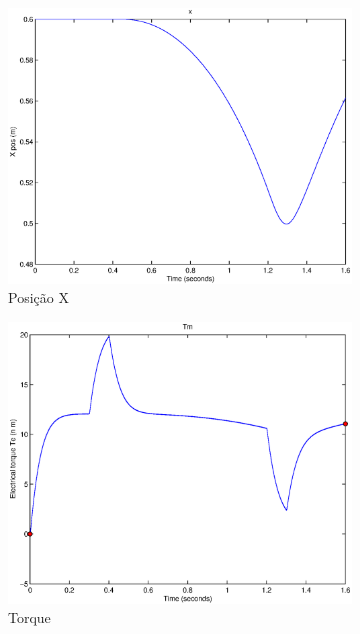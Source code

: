 \documentclass{article}
\begin{document}
\begin{figure}[H]
\begin{subfigure}{0.45\textwidth}
		\includegraphics[width=\linewidth]{matlab/x7}
		\caption{Posição X}
	\end{subfigure}
	\begin{subfigure}{0.45\textwidth}
		\includegraphics[width=\linewidth]{matlab/tm7}
		\caption{Torque}
	\end{subfigure}
	\begin{subfigure}{0.45\textwidth}

\end{subfigure}
\end{figure}
\end{document}
